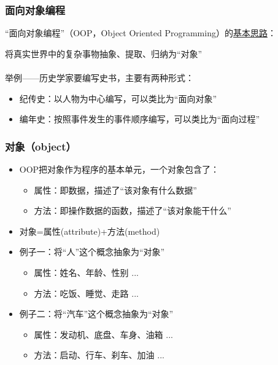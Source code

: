 \begin{frame}
  \frametitle{面向对象编程}

    “面向对象编程”（OOP，Object Oriented Programming）的\underline{基本思路}：
    
    将真实世界中的复杂事物抽象、提取、归纳为“对象”
  \\
  \\
  举例——历史学家要编写史书，主要有两种形式：
      \begin{itemize}
        \item 纪传史：以人物为中心编写，可以类比为“面向对象”
        \item 编年史：按照事件发生的事件顺序编写，可以类比为“面向过程”
      \end{itemize}

\end{frame}

\begin{frame}
  \frametitle{对象（object）}
  \begin{itemize}
    \item OOP把对象作为程序的基本单元，一个对象包含了：
      \begin{itemize}
        \item 属性：即数据，描述了“该对象有什么数据”
        \item 方法：即操作数据的函数，描述了“该对象能干什么”
      \end{itemize}
    \item 对象=属性(attribute)+方法(method)
    \item 例子一：将“人”这个概念抽象为“对象”
      \begin{itemize}
        \item 属性：姓名、年龄、性别 ...
        \item 方法：吃饭、睡觉、走路 ...
      \end{itemize}
    \item 例子二：将“汽车”这个概念抽象为“对象”
      \begin{itemize}
        \item 属性：发动机、底盘、车身、油箱 ...
        \item 方法：启动、行车、刹车、加油 ...
      \end{itemize}
  \end{itemize}
\end{frame}

